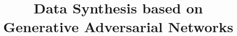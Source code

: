 \documentclass[sigconf,edbt]{acmart-edbt2018}
\begin{document}
\title{Data Synthesis based on Generative Adversarial Networks}
  





\renewcommand{\shortauthors}{XXXX et al.}
\end{document}
